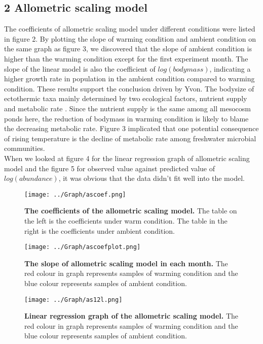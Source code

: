 \documentclass[11pt]{article}
\begin{document}
\begin{linenumbers}
\section*{2 Allometric scaling model}
The coefficients of allometric scaling model under different conditions were listed in figure 2.
By plotting the slope of warming condition and ambient condition on the same graph as figure 3, we discovered that the slope of ambient condition is higher than the warming condition except for the first experiment month.
The slope of the linear model is also the coefficient of $log(bodymass)$, indicating a higher growth rate in population in the ambient condition compared to warming condition. These results support the conclusion driven by Yvon.
The bodysize of ectothermic taxa mainly determined by two ecological factors, nutrient supply and metabolic rate \cite{sheridan2011shrinking}. Since the nutrient supply is the same among all mesocosm ponds here, the reduction of bodymass in warming condition is likely to blame the decreasing metabolic rate. Figure 3 implicated that one potential consequence of rising temperature is the decline of metabolic rate among freshwater microbial communities.  \\
When we looked at figure 4 for the linear regression graph of allometric scaling model and the figure 5 for observed value against predicted value of $log(abundance)$, it was obvious that the data didn't fit well into the model.
\begin{figure}[H]
  \centering
  \texttt{[image: ../Graph/ascoef.png]}
  \caption{\textbf{The coefficients of the allometric scaling model.}  The table on the left is the coefficients under warm condition. The table in the right is the coefficients under ambient condition. }
\end{figure}

\begin{figure}[H]
  \centering
  \texttt{[image: ../Graph/ascoefplot.png]}
  \caption{\textbf{The slope of allometric scaling model in each month.}  The red colour in graph represents samples of warming condition and the blue colour represents samples of ambient condition. }
\end{figure}

\begin{figure}[H]
  \centering
  \texttt{[image: ../Graph/as12l.png]}
  \caption{\textbf{Linear regression graph of the allometric scaling model.}
  The red colour in graph represents samples of warming condition and the blue colour represents samples of ambient condition. }
\end{figure}


\end{linenumbers}
\end{document}

